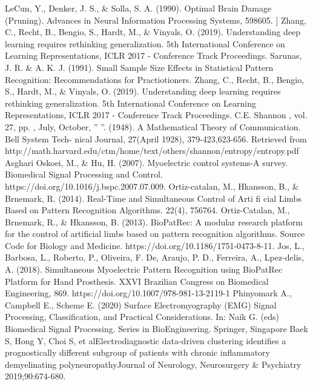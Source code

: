 \documentclass[letterpaper, 10 pt, conference]{ieeeconf}  %
\begin{document}
\begin{thebibliography}{99}

 LeCun, Y., Denker, J. S., \& Solla, S. A. (1990). Optimal Brain Damage (Pruning). Advances in Neural Information Processing Systems, 598605.
] Zhang, C., Recht, B., Bengio, S., Hardt, M., \& Vinyals, O. (2019). Understanding deep learning requires rethinking generalization. 5th International Conference on Learning Representations, ICLR 2017 - Conference Track Proceedings.
 Sarunas, J. R. \& A. K. J. (1991). Small Sample Size Effects in Statistical Pattern Recognition: Recommendations for Practiotioners.
 Zhang, C., Recht, B., Bengio, S., Hardt, M., \& Vinyals, O. (2019). Understanding deep learning requires rethinking generalization. 5th International Conference on Learning Representations, ICLR 2017 - Conference Track Proceedings.
 C.E. Shannon , vol. 27, pp. , July, October, ” ”. (1948). A Mathematical Theory of Communication. Bell System Tech- nical Journal, 27(April 1928), 379-423,623-656. Retrieved from http://math.harvard.edu/ctm/home/text/others/shannon/entropy/entropy.pdf
 Asghari Oskoei, M., \& Hu, H. (2007). Myoelectric control systems-A survey. Biomedical Signal Processing and Control. https://doi.org/10.1016/j.bspc.2007.07.009.
 Ortiz-catalan, M., Hkansson, B., \& Brnemark, R. (2014). Real-Time and Simultaneous Control of Arti fi cial Limbs Based on Pattern Recognition Algorithms. 22(4), 756764.
 Ortiz-Catalan, M., Brnemark, R., \& Hkansson, B. (2013). BioPatRec: A modular research platform for the control of artificial limbs based on pattern recognition algorithms. Source Code for Biology and Medicine. https://doi.org/10.1186/1751-0473-8-11.
 Jos, L., Barbosa, L., Roberto, P., Oliveira, F. De, Araujo, P. D., Ferreira, A., Lpez-delis, A. (2018). Simultaneous Myoelectric Pattern Recognition using BioPatRec Platform for Hand Prosthesis. XXVI Brazilian Congress on Biomedical Engineering, 869. https://doi.org/10.1007/978-981-13-2119-1
 Phinyomark A., Campbell E., Scheme E. (2020) Surface Electromyography (EMG) Signal Processing, Classification, and Practical Considerations. In: Naik G. (eds) Biomedical Signal Processing. Series in BioEngineering. Springer, Singapore
 Baek S, Hong Y, Choi S, et alElectrodiagnostic data-driven clustering identifies a prognostically different subgroup of patients with chronic inflammatory demyelinating polyneuropathyJournal of Neurology, Neurosurgery \& Psychiatry 2019;90:674-680.

\end{thebibliography}
\end{document}

